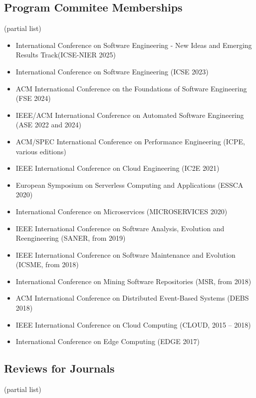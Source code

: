 \documentclass[paper=letter,fontsize=11pt]{scrartcl} %
\begin{document}
\subsection*{Program Commitee Memberships}

(partial list)

\begin{itemize}
  \item International Conference on Software Engineering - New Ideas and Emerging Results Track(ICSE-NIER 2025)
  \item International Conference on Software Engineering (ICSE 2023)
  \item ACM International Conference on the Foundations of Software Engineering (FSE 2024)
  \item IEEE/ACM International Conference on Automated Software Engineering (ASE 2022 and 2024)
	\item ACM/SPEC International Conference on Performance Engineering (ICPE, various editions)
  \item IEEE International Conference on Cloud Engineering (IC2E 2021)
	\item European Symposium on Serverless Computing and Applications (ESSCA 2020)
	\item International Conference on Microservices (MICROSERVICES 2020)
	\item IEEE International Conference on Software Analysis, Evolution and Reengineering (SANER, from 2019)
	\item IEEE International Conference on Software Maintenance and Evolution (ICSME, from 2018)
	\item International Conference on Mining Software Repositories (MSR, from 2018)
  \item ACM International Conference on Distributed Event-Based Systems (DEBS 2018)
	\item IEEE International Conference on Cloud Computing (CLOUD, 2015 -- 2018)
	\item International Conference on Edge Computing (EDGE 2017)
\end{itemize}

\subsection*{Reviews for Journals}

(partial list)
\end{document}
